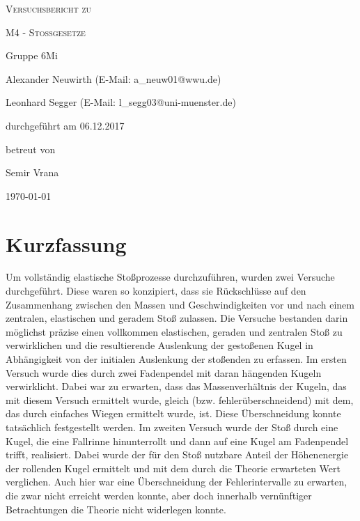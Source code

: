 \documentclass[
	a4paper,
	12pt,
	pagesize,
	ngerman
]{scrartcl}
\begin{document}
	
	\begin{titlepage}
		\centering
		{\scshape\LARGE Versuchsbericht zu \par}
		\vspace{1cm}
		{\scshape\huge M4 - Stoßgesetze\par}
		\vspace{2.5cm}
		{\LARGE Gruppe 6Mi \par}
		\vspace{0.5cm}
		
		{\large Alexander Neuwirth (E-Mail: a\_neuw01@wwu.de) \par}
		{\large Leonhard Segger (E-Mail: l\_segg03@uni-muenster.de) \par}
		\vfill
		
		durchgeführt am 06.12.2017\par
		betreut von\par
		{\large Semir Vrana}
		
		\vfill
		
		{\large \today\par}
	\end{titlepage}
	\tableofcontents
	\newpage
	
	\section{Kurzfassung}
	Um vollständig elastische Stoßprozesse durchzuführen, wurden zwei Versuche durchgeführt.
	Diese waren so konzipiert, dass sie Rückschlüsse auf den Zusammenhang zwischen den Massen und Geschwindigkeiten vor und nach einem zentralen, elastischen und geradem Stoß zulassen.
	Die Versuche bestanden darin möglichst präzise einen vollkommen elastischen, geraden und zentralen Stoß zu verwirklichen und die resultierende Auslenkung der gestoßenen Kugel in Abhängigkeit von der initialen Auslenkung der stoßenden zu erfassen.
	Im ersten Versuch wurde dies durch zwei Fadenpendel mit daran hängenden Kugeln verwirklicht.
	Dabei war zu erwarten, dass das Massenverhältnis der Kugeln, das mit diesem Versuch ermittelt wurde, gleich (bzw. fehlerüberschneidend) mit dem, das durch einfaches Wiegen ermittelt wurde, ist.
	Diese Überschneidung konnte tatsächlich festgestellt werden.
	Im zweiten Versuch wurde der Stoß durch eine Kugel, die eine Fallrinne hinunterrollt und dann auf eine Kugel am Fadenpendel trifft, realisiert.
	Dabei wurde der für den Stoß nutzbare Anteil der Höhenenergie der rollenden Kugel ermittelt und mit dem durch die Theorie erwarteten Wert verglichen.
	Auch hier war eine Überschneidung der Fehlerintervalle zu erwarten, die zwar nicht erreicht werden konnte, aber doch innerhalb vernünftiger Betrachtungen die Theorie nicht widerlegen konnte. %
	
\end{document}
